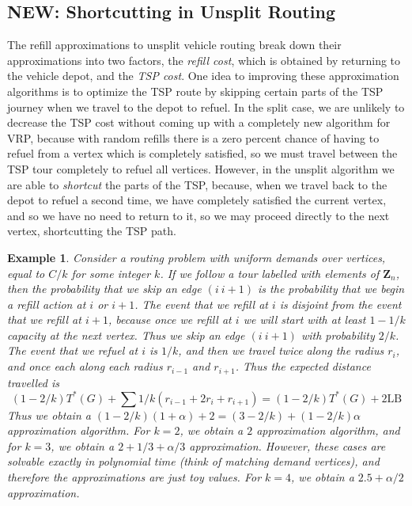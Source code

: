 \documentclass{article}
\theoremstyle{plain}
\newtheorem*{example}{Example}
\begin{document}
\subsection{NEW: Shortcutting in Unsplit Routing}

The refill approximations to unsplit vehicle routing break down their approximations into two factors, the {\it refill cost}, which is obtained by returning to the vehicle depot, and the {\it TSP cost}. One idea to improving these approximation algorithms is to optimize the TSP route by skipping certain parts of the TSP journey when we travel to the depot to refuel. In the split case, we are unlikely to decrease the TSP cost without coming up with a completely new algorithm for VRP, because with random refills there is a zero percent chance of having to refuel from a vertex which is completely satisfied, so we must travel between the TSP tour completely to refuel all vertices. However, in the unsplit algorithm we are able to {\it shortcut} the parts of the TSP, because, when we travel back to the depot to refuel a second time, we have completely satisfied the current vertex, and so we have no need to return to it, so we may proceed directly to the next vertex, shortcutting the TSP path.

\begin{example}
    Consider a routing problem with uniform demands over vertices, equal to $C/k$ for some integer $k$. If we follow a tour labelled with elements of $\mathbf{Z}_n$, then the probability that we skip an edge $(i\ i+1)$ is the probability that we begin a refill action at $i$ or $i+1$. The event that we refill at $i$ is disjoint from the event that we refill at $i+1$, because once we refill at $i$ we will start with at least $1-1/k$ capacity at the next vertex. Thus we skip an edge $(i\ i+1)$ with probability $2/k$. The event that we refuel at $i$ is $1/k$, and then we travel twice along the radius $r_i$, and once each along each radius $r_{i-1}$ and $r_{i+1}$. Thus the expected distance travelled is
    \[ (1 - 2/k) T^*(G) + \sum 1/k (r_{i-1} + 2r_i + r_{i+1}) = (1 - 2/k) T^*(G) + 2 \text{LB} \]
    Thus we obtain a $(1 - 2/k)(1 + \alpha) + 2 = (3 - 2/k) + (1-2/k) \alpha$ approximation algorithm. For $k = 2$, we obtain a $2$ approximation algorithm, and for $k = 3$, we obtain a $2 + 1/3 + \alpha/3$ approximation. However, these cases are solvable exactly in polynomial time (think of matching demand vertices), and therefore the approximations are just toy values. For $k = 4$, we obtain a $2.5 + \alpha/2$ approximation.
\end{example}
\end{document}
